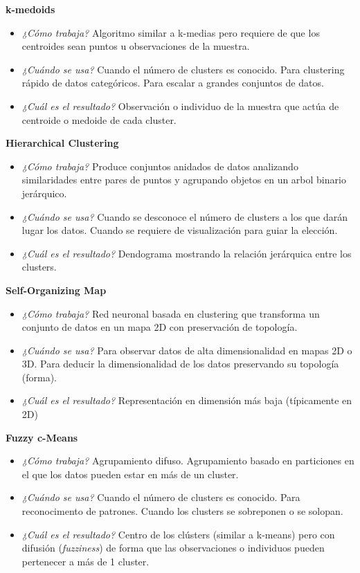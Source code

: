 \documentclass[]{book}
\begin{document}
\textbf{k-medoids}

\begin{itemize}
\item
  \emph{¿Cómo trabaja?} Algoritmo similar a k-medias pero requiere de que los centroides sean puntos u observaciones de la muestra.
\item
  \emph{¿Cuándo se usa?} Cuando el número de clusters es conocido. Para clustering rápido de datos categóricos. Para escalar a grandes conjuntos de datos.
\item
  \emph{¿Cuál es el resultado?} Observación o individuo de la muestra que actúa de centroide o medoide de cada cluster.
\end{itemize}

\textbf{Hierarchical Clustering}

\begin{itemize}
\item
  \emph{¿Cómo trabaja?} Produce conjuntos anidados de datos analizando similaridades entre pares de puntos y agrupando objetos en un arbol binario jerárquico.
\item
  \emph{¿Cuándo se usa?} Cuando se desconoce el número de clusters a los que darán lugar los datos. Cuando se requiere de visualización para guiar la elección.
\item
  \emph{¿Cuál es el resultado?} Dendograma mostrando la relación jerárquica entre los clusters.
\end{itemize}

\textbf{Self-Organizing Map}

\begin{itemize}
\item
  \emph{¿Cómo trabaja?} Red neuronal basada en clustering que transforma un conjunto de datos en un mapa 2D con preservación de topología.
\item
  \emph{¿Cuándo se usa?} Para observar datos de alta dimensionalidad en mapas 2D o 3D. Para deducir la dimensionalidad de los datos preservando su topología (forma).
\item
  \emph{¿Cuál es el resultado?} Representación en dimensión más baja (típicamente en 2D)
\end{itemize}

\textbf{Fuzzy c-Means}

\begin{itemize}
\item
  \emph{¿Cómo trabaja?} Agrupamiento difuso. Agrupamiento basado en particiones en el que los datos pueden estar en más de un cluster.
\item
  \emph{¿Cuándo se usa?} Cuando el número de clusters es conocido. Para reconocimento de patrones. Cuando los clusters se sobreponen o se solopan.
\item
  \emph{¿Cuál es el resultado?} Centro de los clústers (similar a k-means) pero con difusión (\emph{fuzziness}) de forma que las observaciones o individuos pueden pertenecer a más de 1 cluster.
\end{itemize}
\end{document}
